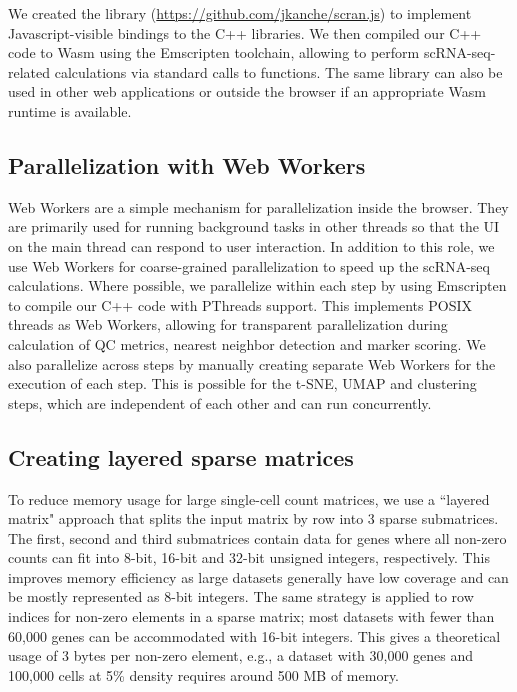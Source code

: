\documentclass{article}
\begin{document}
We created the  library (\url{https://github.com/jkanche/scran.js}) to implement Javascript-visible bindings to the C++ libraries.
We then compiled our C++ code to Wasm using the Emscripten toolchain, allowing  to perform scRNA-seq-related calculations via standard calls to  functions.
The same library can also be used in other web applications or outside the browser if an appropriate Wasm runtime is available.


\subsection{Parallelization with Web Workers}

Web Workers are a simple mechanism for parallelization inside the browser.
They are primarily used for running background tasks in other threads so that the UI on the main thread can respond to user interaction.
In addition to this role, we use Web Workers for coarse-grained parallelization to speed up the scRNA-seq calculations.
Where possible, we parallelize within each step by using Emscripten to compile our C++ code with PThreads support.
This implements POSIX threads as Web Workers, allowing for transparent parallelization during calculation of QC metrics, nearest neighbor detection and marker scoring.
We also parallelize across steps by manually creating separate Web Workers for the execution of each step.
This is possible for the t-SNE, UMAP and clustering steps, which are independent of each other and can run concurrently.


\subsection{Creating layered sparse matrices}

To reduce memory usage for large single-cell count matrices, we use a ``layered matrix" approach that splits the input matrix by row into 3 sparse submatrices.
The first, second and third submatrices contain data for genes where all non-zero counts can fit into 8-bit, 16-bit and 32-bit unsigned integers, respectively.
This improves memory efficiency as large datasets generally have low coverage and can be mostly represented as 8-bit integers.
The same strategy is applied to row indices for non-zero elements in a sparse matrix; most datasets with fewer than 60,000 genes can be accommodated with 16-bit integers.
This gives a theoretical usage of 3 bytes per non-zero element, e.g., a dataset with 30,000 genes and 100,000 cells at 5\% density requires around 500 MB of memory.
\end{document}

